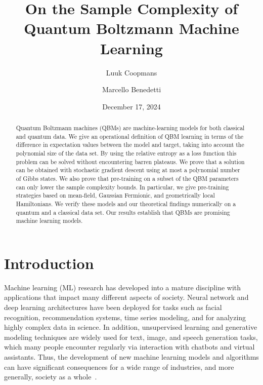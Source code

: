 \documentclass[
    reprint,
    aps,
    prx,
    longbibliography
]{revtex4-2}
\begin{document}
\title{On the Sample Complexity of Quantum Boltzmann Machine Learning}

\author{Luuk Coopmans}

\author{Marcello Benedetti}

\date{December 17, 2024}

\begin{abstract}
Quantum Boltzmann machines (QBMs) are machine-learning models for both classical and quantum data. We give an operational definition of QBM learning in terms of the difference in expectation values between the model and target, taking into account the polynomial size of the data set.
By using the relative entropy as a loss function this problem can be solved without encountering barren plateaus.
We prove that a solution can be obtained with stochastic gradient descent using at most a polynomial number of Gibbs states. 
We also prove that pre-training on a subset of the QBM parameters can only lower the sample complexity bounds. In particular, we give pre-training strategies based on mean-field, Gaussian Fermionic, and geometrically local Hamiltonians. We verify these models and our theoretical findings numerically on a quantum and a classical data set. 
Our results establish that QBMs are promising machine learning models.
\end{abstract}

\maketitle

\section*{Introduction}

Machine learning (ML) research has developed into a mature discipline with applications that impact many different aspects of society. Neural network and deep learning architectures have been deployed for tasks such as facial recognition, recommendation systems, time series modeling, and for analyzing highly complex data in science. In addition, unsupervised learning and generative modeling techniques are widely used for text, image, and speech generation tasks, which many people encounter regularly via interaction with chatbots and virtual assistants. Thus, the development of new machine learning models and algorithms can have significant consequences for a wide range of industries, and more generally, society as a whole~\cite{Bommasani_2021}.
\end{document}
